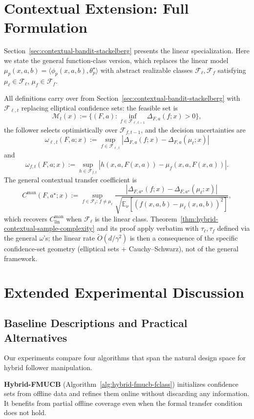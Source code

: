 \documentclass{article}
\newcommand{\cM}{\mathcal{M}}
\newcommand{\E}{\mathbb{E}}           %
\newcommand{\cF}{\mathcal{F}}
\begin{document}
\section{Contextual Extension: Full Formulation}
\label{app:contextual-details}

Section~\ref{sec:contextual-bandit-stackelberg} presents the linear specialization. Here we state the general function-class version, which replaces the linear model $\mu_p(x,a,b) = \langle \phi_p(x,a,b), \theta_p^\star \rangle$ with abstract realizable classes $\cF_\ell, \cF_f$ satisfying $\mu_\ell \in \cF_\ell$, $\mu_f \in \cF_f$.

All definitions carry over from Section~\ref{sec:contextual-bandit-stackelberg} with $\cF_{\ell,t}$ replacing elliptical confidence sets: the feasible set is $$\cM_t(x) := \{(F,a) : \inf_{f \in \cF_{\ell,t-1}} \Delta_{F,a}(f;x) > 0\},$$ the follower selects optimistically over $\cF_{f,t-1}$, and the decision uncertainties are $$\omega_{\ell,t}(F,a;x) := \sup_{f \in \cF_{\ell,t}} |\Delta_{F,a}(f;x) - \Delta_{F,a}(\mu_\ell;x)|$$ and $$\omega_{f,t}(F,a;x) := \sup_{h \in \cF_{f,t}} |h(x,a,F(x,a)) - \mu_f(x,a,F(x,a))|.$$ The general contextual transfer coefficient is
\[
    C^{\mathrm{man}}(F,a^\star;x) := \sup_{f \in \cF_\ell:\,f\neq\mu_\ell} \frac{|\Delta_{F,a^\star}(f;x) - \Delta_{F,a^\star}(\mu_\ell;x)|}{\sqrt{\E_\nu[(f(x,a,b) - \mu_\ell(x,a,b))^2]}},
\]
which recovers $C^{\mathrm{man}}_{\mathrm{lin}}$ when $\cF_\ell$ is the linear class. Theorem~\ref{thm:hybrid-contextual-sample-complexity} and its proof apply verbatim with $\tau_\ell, \tau_f$ defined via the general $\omega$'s; the linear rate $\widetilde O(d/\gamma^2)$ is then a consequence of the specific confidence-set geometry (elliptical sets + Cauchy--Schwarz), not of the general framework.

\section{Extended Experimental Discussion}
\label{app:extended-experiments}

\subsection{Baseline Descriptions and Practical Alternatives}
\label{app:baselines}

Our experiments compare four algorithms that span the natural design space for hybrid follower manipulation.

\textbf{Hybrid-FMUCB} (Algorithm~\ref{alg:hybrid-fmucb-fclass}) initializes confidence sets from offline data and refines them online without discarding any information. It benefits from partial offline coverage even when the formal transfer condition does not hold.
\end{document}
